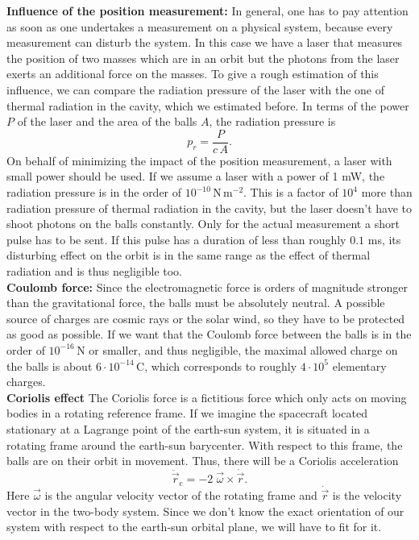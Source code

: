 \documentclass[prb,preprint]{revtex4-1}
\begin{document}
\textbf{Influence of the position measurement:} In general, one has to pay attention as soon as one undertakes a measurement on a physical system, because every measurement can disturb the system. In this case we have a laser that measures the position of two masses which are in an orbit but the photons from the laser exerts an additional force on the masses. To give a rough estimation of this influence, we can compare the radiation pressure of the laser with the one of thermal radiation in the cavity, which we estimated before. In terms of the power $P$ of the laser and the area of the balls $A$, the radiation pressure is
\begin{equation}
\label{eq:radpress}
p_r = \frac{P}{c\,A}.
\end{equation}
On behalf of minimizing the impact of the position measurement, a laser with small power should be used. If we assume a laser with a power of 1 mW, the radiation pressure is in the order of $10^{-10} \, \mathrm{N} \, \mathrm{m}^{-2}$. This is a factor of $10^4$ more than radiation pressure of thermal radiation in the cavity, but the laser doesn't have to shoot photons on the balls constantly. Only for the actual measurement a short pulse has to be sent. If this pulse has a duration of less than roughly $0.1$ ms, its disturbing effect on the orbit is in the same range as the effect of thermal radiation and is thus negligible too.\\

\textbf{Coulomb force:}
Since the electromagnetic force is orders of magnitude stronger than the gravitational force, the balls must be absolutely neutral. A possible source of charges are cosmic rays or the solar wind, so they have to be protected as good as possible. If we want that the Coulomb force between the balls is in the order of $10^{-16} \,\mathrm{N}$ or smaller, and thus negligible, the maximal allowed charge on the balls is about $6 \cdot 10^{-14}\,\mathrm{C}$, which corresponds to roughly $4 \cdot 10^5$ elementary charges.\\

\textbf{Coriolis effect}
\label{sec:coriolis}
The Coriolis force is a fictitious force which only acts on moving bodies in a rotating reference frame. If we imagine the spacecraft located stationary at a Lagrange point of the earth-sun system, it is situated in a rotating frame around the earth-sun barycenter. With respect to this frame, the balls are on their orbit in movement. Thus, there will be a Coriolis acceleration
\begin{equation}
\label{eq:coriolis}
\ddot{\vec{r}}_\mathrm{c} = - 2 \; \vec{\omega} \times \dot{\vec{r}}.
\end{equation}
Here $\vec{\omega}$ is the angular velocity vector of the rotating frame and $\dot{\vec{r}}$ is the velocity vector in the two-body system. Since we don't know the exact orientation of our system with respect to the earth-sun orbital plane, we will have to fit for it.\\
\end{document}
